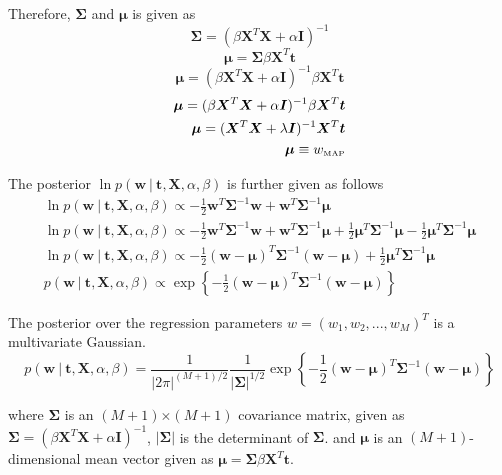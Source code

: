 \documentclass[11pt]{article}
\newcommand{\map}[1]{{#1}_{\text{\tiny MAP}}}
\newcommand\given[1][]{\:#1\vert\:}
\begin{document}
Therefore, $\bm{\Sigma}$ and $\bm{\mu}$ is given as
\begin{equation}
    \bm{\Sigma} = (\beta \bm{X}^T\bm{X} + \alpha \bm{I})^{-1}
\end{equation}
\begin{equation}
    \bm{\mu} = \bm{\Sigma}\beta \bm{X}^T \bm{t} 
\end{equation}
\begin{equation}
    \bm{\mu} = (\beta \bm{X}^T\bm{X} + \alpha \bm{I})^{-1}\beta \bm{X}^T \bm{t}
\end{equation}
\begin{eqnarray}
    \bm{\mu} = (\beta \bm{X}^T\bm{X} + \alpha \bm{I})^{-1}\beta \bm{X}^T \bm{t} \\
    \bm{\mu} = (\bm{X}^T\bm{X} + \lambda \bm{I})^{-1}\bm{X}^T \bm{t} \\
    \bm{\mu} \equiv \map{w}
\end{eqnarray}

The posterior $\ln{p(\bm{w} \given \bm{t}, \bm{X}, \alpha, \beta)}$ is further given as follows
\begin{eqnarray}
    \ln{p(\bm{w} \given \bm{t}, \bm{X}, \alpha, \beta)} \propto -\frac{1}{2} \bm{w}^T \bm{\Sigma}^{-1} \bm{w}  + \bm{w}^T \bm{\Sigma}^{-1} \bm{\mu}\\
    \ln{p(\bm{w} \given \bm{t}, \bm{X}, \alpha, \beta)} \propto -\frac{1}{2} \bm{w}^T \bm{\Sigma}^{-1} \bm{w}  + \bm{w}^T \bm{\Sigma}^{-1} \bm{\mu} + \frac{1}{2}\bm{\mu}^T\bm{\Sigma}^{-1}\bm{\mu} - \frac{1}{2}\bm{\mu}^T\bm{\Sigma}^{-1}\bm{\mu} \\
    \ln{p(\bm{w} \given \bm{t}, \bm{X}, \alpha, \beta)} \propto -\frac{1}{2}\left(\bm{w} - \bm{\mu}\right)^T\bm{\Sigma}^{-1}\left(\bm{w} - \bm{\mu}\right) + \frac{1}{2}\bm{\mu}^T\bm{\Sigma}^{-1}\bm{\mu}\\
    p(\bm{w} \given \bm{t}, \bm{X}, \alpha, \beta) \propto \exp{\left\{ -\frac{1}{2}\left(\bm{w} - \bm{\mu}\right)^T\bm{\Sigma}^{-1}\left(\bm{w} - \bm{\mu}\right) \right\}}
\end{eqnarray}

The posterior over the regression parameters $w = (w_1,w_2,...,w_M)^T$ is a multivariate Gaussian.
\begin{equation}
    p(\bm{w} \given \bm{t}, \bm{X}, \alpha, \beta) = \frac{1}{|2\pi|^{(M+1)/2}}\frac{1}{|\bm{\Sigma}|^{1/2}} \exp\left\{-\frac{1}{2} (\bm{w} - \bm{\mu})^T \bm{\Sigma}^{-1} (\bm{w} - \bm{\mu}) \right\}
\end{equation}

where $\bm{\Sigma}$ is an $(M+1)$$\times$$(M+1)$ covariance matrix, given as $\bm{\Sigma} = (\beta \bm{X}^T\bm{X} + \alpha \bm{I})^{-1}$, $|\bm{\Sigma}|$ is the determinant of $\bm{\Sigma}$. and $\bm{\mu}$ is an $(M+1)$-dimensional mean vector given as $\bm{\mu} = \bm{\Sigma}\beta \bm{X}^T \bm{t}$.
\end{document}
